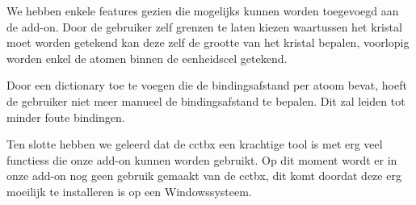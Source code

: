 \par
We hebben enkele features gezien die mogelijks kunnen worden toegevoegd aan de add-on. Door de gebruiker zelf grenzen te laten kiezen waartussen het kristal moet worden getekend kan deze zelf de grootte van het kristal bepalen, voorlopig worden enkel de atomen binnen de eenheidscel getekend.
\par
Door een dictionary toe te voegen die de bindingsafstand per atoom bevat, hoeft de gebruiker niet meer manueel de bindingsafstand te bepalen. Dit zal leiden tot minder foute bindingen.
\par
Ten slotte hebben we geleerd dat de cctbx een krachtige tool is met erg veel functiess die onze add-on kunnen worden gebruikt. Op dit moment wordt er in onze add-on nog geen gebruik gemaakt van de cctbx, dit komt doordat deze erg moeilijk te installeren is op een Windowssysteem.  


 
   
